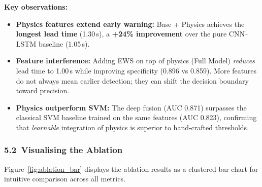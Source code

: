 \documentclass[12pt,a4paper]{article}
\begin{document}
\noindent\textbf{Key observations:}
\begin{itemize}[leftmargin=*, itemsep=3pt]
  \item \textbf{Physics features extend early warning:} Base + Physics achieves the
        \textbf{longest lead time} (1.30\,s), a \textbf{+24\% improvement} over the pure
        CNN--LSTM baseline (1.05\,s).
  \item \textbf{Feature interference:} Adding EWS on top of physics (Full Model) \emph{reduces}
        lead time to 1.00\,s while improving specificity (0.896 vs 0.859). More features do not
        always mean earlier detection; they can shift the decision boundary toward precision.
  \item \textbf{Physics outperform SVM:} The deep fusion (AUC 0.871) surpasses the classical
        SVM baseline trained on the same features (AUC 0.823), confirming that \emph{learnable}
        integration of physics is superior to hand-crafted thresholds.
\end{itemize}

\subsubsection*{5.2\ Visualising the Ablation}

Figure~\ref{fig:ablation_bar} displays the ablation results as a clustered bar chart for
intuitive comparison across all metrics.
\end{document}
